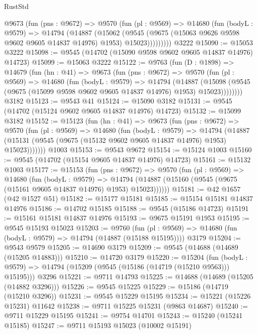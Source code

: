 \begin{lexlean}{RustStd}
\begin{coremodule}
        @9673
          (fun (pns : @9672) =>
          @9570
            (fun (pl : @9569) =>
            @14680
              (fun (bodyL : @9579) =>
              @14794
                (@14887
                  (@15062
                    (@9545
                      (@9675 (@15063 @9626 @9598 @9602 @9605 @14837 @14976) @1953)
                      @15023)))))))))
    @3222
@15090 := @15053 @3222
@15098 := @9545 (@14702 (@15090 @9598 @9602 @9605 @14837 @14976) @14723)
@15099 := @15063 @3222
@15122 := @9763
    (fun (D : @1898) =>
    @14679
      (fun (hn : @41) =>
      @9673
        (fun (pns : @9672) =>
        @9570
          (fun (pl : @9569) =>
          @14680
            (fun (bodyL : @9579) =>
            @14794
              (@14887
                (@15098 (@9545 (@9675 (@15099 @9598 @9602 @9605 @14837 @14976) @1953) @15023))))))))
    @3182
@15123 := @9543 @41
@15124 := @15090 @3182
@15131 := @9545 (@14702 (@15124 @9602 @9605 @14837 @14976) @14723)
@15132 := @15099 @3182
@15152 := @15123
    (fun (hn : @41) =>
    @9673
      (fun (pns : @9672) =>
      @9570
        (fun (pl : @9569) =>
        @14680
          (fun (bodyL : @9579) =>
          @14794
            (@14887 (@15131 (@9545 (@9675 (@15132 @9602 @9605 @14837 @14976) @1953) @15023)))))))
    @1003
@15153 := @9543 @9672
@15154 := @15124 @1003
@15160 := @9545 (@14702 (@15154 @9605 @14837 @14976) @14723)
@15161 := @15132 @1003
@15177 := @15153
    (fun (pns : @9672) =>
    @9570
      (fun (pl : @9569) =>
      @14680
        (fun (bodyL : @9579) =>
        @14794 (@14887 (@15160 (@9545 (@9675 (@15161 @9605 @14837 @14976) @1953) @15023))))))
@15181 := @42 @1657 (@42 @1527 @51)
@15182 := @15177 @15181
@15185 := @15154 @15181 @14837 @14976
@15186 := @14702 @15185
@15188 := @9545 (@15186 @14723)
@15191 := @15161 @15181 @14837 @14976
@15193 := @9675 @15191 @1953
@15195 := @9545 @15193 @15023
@15203 := @9760
    (fun (pl : @9569) => @14680 (fun (bodyL : @9579) => @14794 (@14887 (@15188 @15195))))
    @3179
@15204 := @9543 @9579
@15205 := @14690 @3179
@15209 := @9545 (@14688 (@14689 (@15205 @14883)))
@15210 := @14720 @3179
@15220 := @15204
    (fun (bodyL : @9579) => @14794 (@15209 (@9545 (@15186 (@14719 (@15210 @9563))) @15195)))
    @3296
@15221 := @9711 @14793
@15225 := @14688 (@14689 (@15205 (@14882 @3296)))
@15226 := @9545 @15225
@15229 := @15186 (@14719 (@15210 @3296))
@15231 := @9545 @15229 @15195
@15234 := @15221 (@15226 @15231) @11642
@15238 := @9711 @15225 @15231 (@9863 @14687)
@15240 := @9711 @15229 @15195
@15241 := @9754 @14701
@15243 := @15240 (@15241 @15185)
@15247 := @9711 @15193 @15023 (@10002 @15191)

\end{coremodule}
\end{lexlean}
